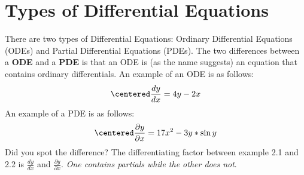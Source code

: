 \documentclass[letter, 11pt]{book}
\begin{document}
\section{Types of Differential Equations}
There are two types of Differential Equations: Ordinary Differential Equations (ODEs) and Partial Differential Equations (PDEs).
The two differences between a \textbf{ODE} and a \textbf{PDE} is that an ODE is (as the name suggests) an equation that contains ordinary differentials. An example of an ODE is as follows:
\begin{equation}\label{Ex. 1}
\centered
\frac{dy}{dx} = 4y - 2x
\end{equation}
An example of a PDE is as follows:
\begin{equation}\label{Ex. 2}
\centered
\frac{\partial y}{\partial x} = 17x^2 -3y*\sin{y}
\end{equation}
Did you spot the difference? The differentiating factor between example 2.1 and 2.2 is $\frac{dy}{dx}$ and $\frac{\partial y}{\partial x}$. \textit{One contains partials while the other does not}.
\end{document}
